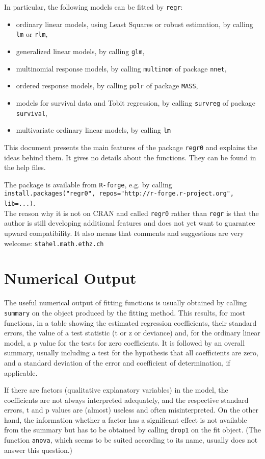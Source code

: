 \documentclass{article}
\providecommand{\T}{\texttt}
\begin{document}
In particular, the following models can be fitted by \T{regr}:
\begin{itemize}
\item 
  ordinary linear models, using Least Squares or robust estimation,
  by calling \T{lm} or \T{rlm},
\item
  generalized linear models, by calling \T{glm},
\item
  multinomial response models, by calling \T{multinom} of package
  \T{nnet},
\item
  ordered response models, by calling \T{polr} of package
  \T{MASS},
\item
  models for survival data and Tobit regression, by calling
  \T{survreg} of package \T{survival},
\item
  multivariate ordinary linear models, by calling \T{lm}
\end{itemize}

This document presents the main features of the package \T{regr0}
and explains the ideas behind them. 
It gives no details about the functions. They can be found in
the help files.

The package is available from \T{R-forge}, e.g. by calling\\
\T{install.packages("regr0", repos="http://r-forge.r-project.org",
  lib=...)}.\\
The reason why it is not on CRAN and called \T{regr0} rather than 
\T{regr} is that the author is still developing additional features and
does not yet want to guarantee upward compatibility.
It also means that comments and suggestions are very welcome:
\T{stahel\@stat.math.ethz.ch}

\section{Numerical Output}
The useful numerical output of fitting functions is usually obtained by
calling \T{summary} on the object produced by the fitting method.
This results, for most functions, in a table showing the estimated
regression coefficients, their standard errors, the value of a test
statistic (t or z or deviance) and, for the 
ordinary linear model, a p value for the tests for zero coefficients. 
It is followed by an overall summary, usually including a test for
the hypothesis that all coefficients are zero, and a standard deviation of
the error and coefficient of determination, if applicable.

If there are factors (qualitative explanatory variables) in the model, 
the coefficients are not always interpreted adequately, and the 
respective standard errors, t and p values are (almost) useless and often
misinterpreted. 
On the other hand, the information whether a factor has a significant
effect is not available from the summary but has to be obtained by calling 
\T{drop1} on the fit object. 
(The function \T{anova}, which seems to be suited according to its
name, usually does not answer this question.)
\end{document}
